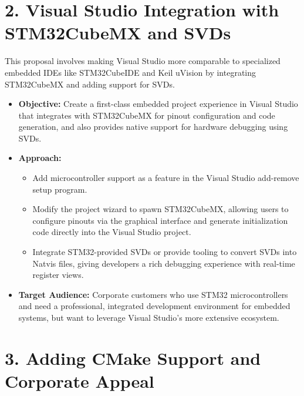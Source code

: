\documentclass{article}
\begin{document}
\section*{2. Visual Studio Integration with STM32CubeMX and SVDs}

This proposal involves making Visual Studio more comparable to specialized embedded IDEs like STM32CubeIDE and Keil uVision by integrating STM32CubeMX and adding support for SVDs.

\begin{itemize}
    \item \textbf{Objective:} Create a first-class embedded project experience in Visual Studio that integrates with STM32CubeMX for pinout configuration and code generation, and also provides native support for hardware debugging using SVDs.
    \item \textbf{Approach:} 
    \begin{itemize}
        \item Add microcontroller support as a feature in the Visual Studio add-remove setup program.
        \item Modify the project wizard to spawn STM32CubeMX, allowing users to configure pinouts via the graphical interface and generate initialization code directly into the Visual Studio project.
        \item Integrate STM32-provided SVDs or provide tooling to convert SVDs into Natvis files, giving developers a rich debugging experience with real-time register views.
    \end{itemize}
    \item \textbf{Target Audience:} Corporate customers who use STM32 microcontrollers and need a professional, integrated development environment for embedded systems, but want to leverage Visual Studio’s more extensive ecosystem.
\end{itemize}

\section*{3. Adding CMake Support and Corporate Appeal}
\end{document}
